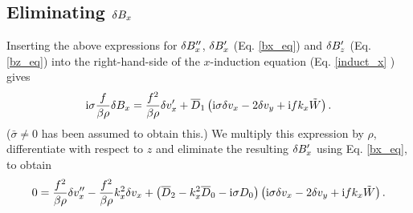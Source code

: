 \subsection{Eliminating $\delta B_x$}
Inserting the above expressions for $\delta B_x^{\prime\prime}$,
$\delta B_x^\prime$ (Eq. \ref{bx_eq}) and $\delta B_z^\prime$  (Eq. \ref{bz_eq})
into the right-hand-side of the $x$-induction equation (Eq. \ref{induct_x} ) gives   
\begin{align}
  \mathrm{i}\sigma \frac{f}{\beta\rho}\delta B_x =
  \frac{f^2}{\beta\rho}\delta v_x^\prime + \overline{D}_1\left(\mathrm{i}\sigma\delta v_x -
  2\delta v_y + \mathrm{i} f k_x\tilde{W}\right). \label{bx_expression}
\end{align}
($\bar{\sigma}\neq0$ has been assumed to obtain this.) 
We multiply this expression by $\rho$, differentiate with respect to
$z$ and eliminate the resulting $\delta B_x^\prime$ using
Eq. \ref{bx_eq}, to obtain
\begin{align}
  0 = \frac{f^2}{\beta\rho}\delta v_x^{\prime\prime} -
  \frac{f^2}{\beta\rho}k_x^2\delta v_x + \left(\overline{D}_2 - k_x^2 \overline{D}_0
    - \mathrm{i}\sigma D_0\right)\left( \mathrm{i}\sigma\delta v_x -
  2\delta v_y + \mathrm{i} f k_x\tilde{W}\right). \label{final_vx} 
\end{align}

